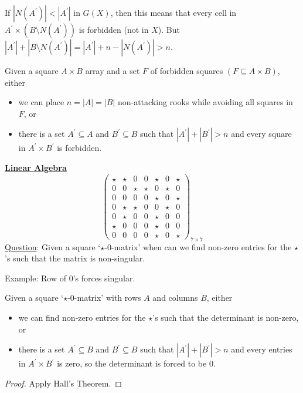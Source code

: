 If $ |N(A^\prime)|<|A^\prime| $ in $ G(X) $, then this means that every cell in $ A^\prime\times
    (B\setminus N(A^\prime)) $ is forbidden (not in $ X $).
But $ |A^\prime|+|B\setminus N(A^\prime)|= |A^\prime|+n-|N(A^\prime)|>n $.

\begin{thmbox}
    \begin{prop}
        Given a square $ A\times B $ array and a set $ F $ of forbidden squares
        $ (F\subseteq A\times B) $, either
        \begin{itemize}
            \item we can place $ n=|A|=|B| $ non-attacking rooks while avoiding all squares
                  in $ F $, or
            \item there is a set $ A^\prime\subseteq A $ and $ B^\prime\subseteq B $
                  such that $ |A^\prime|+|B^\prime|>n $ and every square in $ A^\prime\times B^\prime $
                  is forbidden.
        \end{itemize}
    \end{prop}
\end{thmbox}

\textbf{\underline{Linear Algebra}}
\[ \begin{pmatrix}
        \star & \star & 0     & 0     & \star & 0     & \star \\
        0     & 0     & \star & \star & 0     & \star & 0     \\
        0     & 0     & 0     & 0     & \star & 0     & \star \\
        0     & \star & \star & 0     & 0     & \star & 0     \\
        0     & \star & 0     & 0     & \star & 0     & 0     \\
        \star & 0     & 0     & 0     & \star & 0     & 0     \\
        0     & 0     & 0     & 0     & \star & 0     & \star
    \end{pmatrix}_{7\times 7}
\]
\underline{Question}: Given a square `$ \star $-$ 0 $-matrix' when can we find
non-zero entries for the $ \star $'s such that the matrix is non-singular.

Example: Row of $ 0 $'s forces singular.
\begin{thmbox}
    \begin{prop}
        Given a square `$ \star $-$ 0 $-matrix' with rows $ A $ and columns $ B $,
        either
        \begin{itemize}
            \item we can find non-zero entries for the $ \star $'s such that the determinant
                  is non-zero, or
            \item there is a set $ A^\prime\subseteq B $ and $ B^\prime \subseteq B $
                  such that $ |A^\prime|+|B^\prime|>n $ and every entries in $ A^\prime\times B^\prime $
                  is zero, so the determinant is forced to be $ 0 $.
        \end{itemize}
    \end{prop}
\end{thmbox}
\begin{proof}
    Apply Hall's Theorem.
\end{proof}

